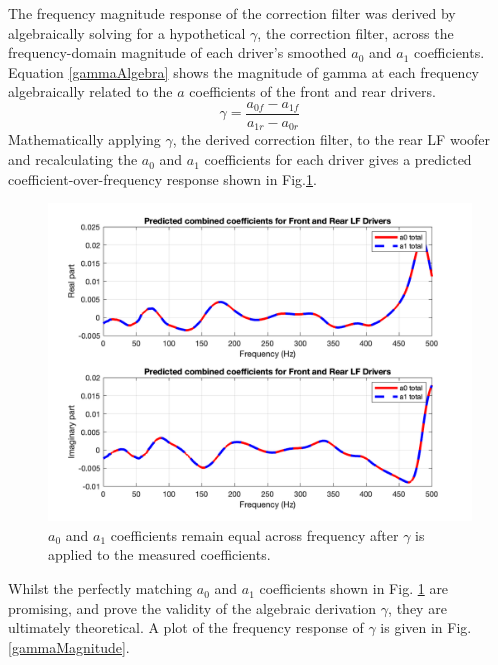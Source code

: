 \documentclass{report}
\begin{document}
            The frequency magnitude response of the correction filter was derived by algebraically solving for a hypothetical $\gamma$, the correction filter, across the frequency-domain magnitude of each driver's smoothed $a_0$ and $a_1$ coefficients.
            Equation \ref{gammaAlgebra} shows the magnitude of gamma at each frequency algebraically related to the $a$ coefficients of the front and rear drivers.
            \begin{equation}
                \gamma = \frac{a_{0f} - a_{1f}}{a_{1r} - a_{0r}}
                \label{gammaAlgebra}
            \end{equation}
            Mathematically applying $\gamma$, the derived correction filter, to the rear LF woofer and recalculating the $a_0$ and $a_1$ coefficients for each driver gives a predicted coefficient-over-frequency response shown in Fig.\ref{coeffsPredicted}.
            \begin{figure}[H]
                \centering
                \includegraphics[scale=0.35]{figs/coeffsPredicted.png}%
                \caption{$a_0$ and $a_1$ coefficients remain equal across frequency after $\gamma$ is applied to the measured coefficients.}
                \label{coeffsPredicted}
            \end{figure}
            Whilst the perfectly matching $a_0$ and $a_1$ coefficients shown in Fig. \ref{coeffsPredicted} are promising, and prove the validity of the algebraic derivation $\gamma$, they are ultimately theoretical.
            A plot of the frequency response of $\gamma$ is given in Fig.\ref{gammaMagnitude}.
\end{document}
